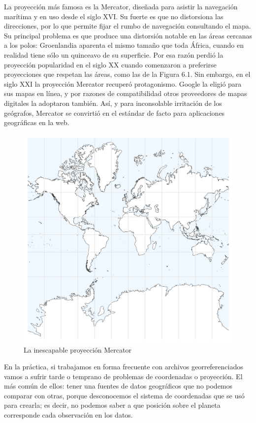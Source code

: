 \documentclass[spanish,]{book}
\begin{document}
La proyección más famosa es la Mercator, diseñada para asistir la navegación marítima y en uso desde el siglo XVI. Su fuerte es que no distorsiona las direcciones, por lo que permite fijar el rumbo de navegación consultando el mapa. Su principal problema es que produce una distorsión notable en las áreas cercanas a los polos: Groenlandia aparenta el mismo tamaño que toda África, cuando en realidad tiene sólo un quinceavo de su superficie. Por esa razón perdió la proyección popularidad en el siglo XX cuando comenzaron a preferirse proyecciones que respetan las áreas, como las de la Figura 6.1. Sin embargo, en el siglo XXI la proyección Mercator recuperó protagonismo. Google la eligió para sus mapas en línea, y por razones de compatibilidad otros proveedores de mapas digitales la adoptaron también. Así, y para inconsolable irritación de los geógrafos, Mercator se convirtió en el estándar de facto para aplicaciones geográficas en la web.

\begin{figure}
\includegraphics[width=1\linewidth]{imagenes/mapamundi_mercator} \caption{La inescapable proyección Mercator}\label{fig:unnamed-chunk-146}
\end{figure}

En la práctica, si trabajamos en forma frecuente con archivos georreferenciados vamos a sufrir tarde o temprano de problemas de coordenadas o proyección. El más común de ellos: tener una fuentes de datos geográficos que no podemos comparar con otras, porque desconocemos el sistema de coordenadas que se usó para crearla; es decir, no podemos saber a que posición sobre el planeta corresponde cada observación en los datos.
\end{document}
